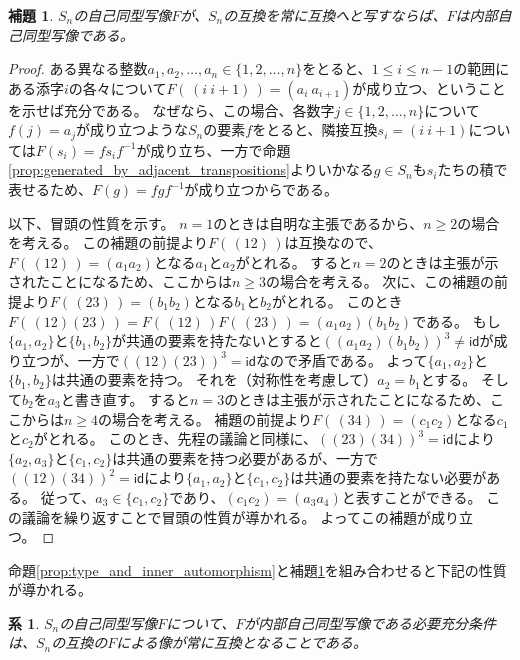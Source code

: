 \documentclass[11pt]{jarticle}
\newtheorem{lemma}{補題}
\newtheorem{corollary}{系}
\begin{document}
\begin{lemma}
\label{lem:inner_automorphism_from_type}
$S_n$の自己同型写像$F$が、$S_n$の互換を常に互換へと写すならば、$F$は内部自己同型写像である。
\end{lemma}
\begin{proof}
ある異なる整数$a_1,a_2,\dots,a_n \in \{1,2,\dots,n\}$をとると、$1 \leq i \leq n-1$の範囲にある添字$i$の各々について$F(\,(i\ i+1)\,) = (a_i\ a_{i+1})$が成り立つ、ということを示せば充分である。
なぜなら、この場合、各数字$j \in \{1,2,\dots,n\}$について$f(j) = a_j$が成り立つような$S_n$の要素$f$をとると、隣接互換$s_i = (i\ i+1)$については$F(s_i) = f s_i f^{-1}$が成り立ち、一方で命題\ref{prop:generated_by_adjacent_transpositions}よりいかなる$g \in S_n$も$s_i$たちの積で表せるため、$F(g) = f g f^{-1}$が成り立つからである。

以下、冒頭の性質を示す。
$n = 1$のときは自明な主張であるから、$n \geq 2$の場合を考える。
この補題の前提より$F(\,(12)\,)$は互換なので、$F(\,(12)\,) = (a_1 a_2)$となる$a_1$と$a_2$がとれる。
すると$n = 2$のときは主張が示されたことになるため、ここからは$n \geq 3$の場合を考える。
次に、この補題の前提より$F(\,(23)\,) = (b_1 b_2)$となる$b_1$と$b_2$がとれる。
このとき$F(\,(12)(23)\,) = F(\,(12)\,)F(\,(23)\,) = (a_1a_2)(b_1b_2)$である。
もし$\{a_1,a_2\}$と$\{b_1,b_2\}$が共通の要素を持たないとすると$((a_1a_2)(b_1b_2))^3 \neq \mathsf{id}$が成り立つが、一方で$((12)(23))^3 = \mathsf{id}$なので矛盾である。
よって$\{a_1,a_2\}$と$\{b_1,b_2\}$は共通の要素を持つ。
それを（対称性を考慮して）$a_2 = b_1$とする。
そして$b_2$を$a_3$と書き直す。
すると$n = 3$のときは主張が示されたことになるため、ここからは$n \geq 4$の場合を考える。
補題の前提より$F(\,(34)\,) = (c_1 c_2)$となる$c_1$と$c_2$がとれる。
このとき、先程の議論と同様に、$((23)(34))^3 = \mathsf{id}$により$\{a_2,a_3\}$と$\{c_1,c_2\}$は共通の要素を持つ必要があるが、一方で$((12)(34))^2 = \mathsf{id}$により$\{a_1,a_2\}$と$\{c_1,c_2\}$は共通の要素を持たない必要がある。
従って、$a_3 \in \{c_1,c_2\}$であり、$(c_1c_2) = (a_3a_4)$と表すことができる。
この議論を繰り返すことで冒頭の性質が導かれる。
よってこの補題が成り立つ。
\end{proof}

命題\ref{prop:type_and_inner_automorphism}と補題\ref{lem:inner_automorphism_from_type}を組み合わせると下記の性質が導かれる。

\begin{corollary}
$S_n$の自己同型写像$F$について、$F$が内部自己同型写像である必要充分条件は、$S_n$の互換の$F$による像が常に互換となることである。
\end{corollary}
\end{document}
